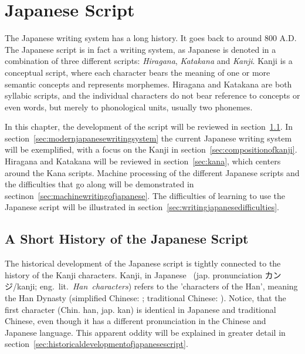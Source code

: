
\chapter{Japanese Script}
\label{sec:japansescript}

The Japanese writing system has a long history. It goes back to around 800 A.D. 
The Japanese script is in fact a writing system, as Japanese is denoted in 
a combination of three different scripts: \emph{Hiragana}, \emph{Katakana} and 
\emph{Kanji}. Kanji is a conceptual script, where each character bears the 
meaning of one or more semantic concepts and represents morphemes. 
Hiragana and Katakana are both syllabic scripts, and the individual characters do
not bear reference to concepts or even words, but merely to phonological units, 
usually two phonemes.

In this chapter, the development of the script will be reviewed in 
section~\ref{sec:ahorthistoryofjapanesewritingsystem}.
In section~\ref{sec:modernjapanesewritingsystem} the current Japanese writing 
system will be exemplified, with a focus on the Kanji in 
section~\ref{sec:compositionofkanji}. Hiragana and Katakana will be reviewed in
section~\ref{sec:kana}, which centers around the Kana scripts. 
Machine processing of the different Japanese scripts and the difficulties that
go along will be demonstrated in sectinon~\ref{sec:machinewritingofjapanese}.
The difficulties of learning to use the Japanese script will be illustrated in 
section~\ref{sec:writingjapanesedifficulties}.

\section{A Short History of the Japanese Script}
\label{sec:ahorthistoryofjapanesewritingsystem}

The historical development of the Japanese script is tightly connected to the 
history of the Kanji characters. Kanji, in Japanese 
~(jap. pronunciation カンジ/kanji; eng.~lit.~\emph{Han~characters}) 
refers to the 'characters of the Han', meaning the Han Dynasty 
(simplified Chinese: ; traditional Chinese: ).
Notice, that the first character  (Chin. han, jap. kan) is identical
in Japanese and traditional Chinese, even though it has a different 
pronunciation in the Chinese and Japanese language. This apparent oddity will 
be explained in greater detail in 
section~\ref{sec:historicaldevelopmentofjapanesescript}.


